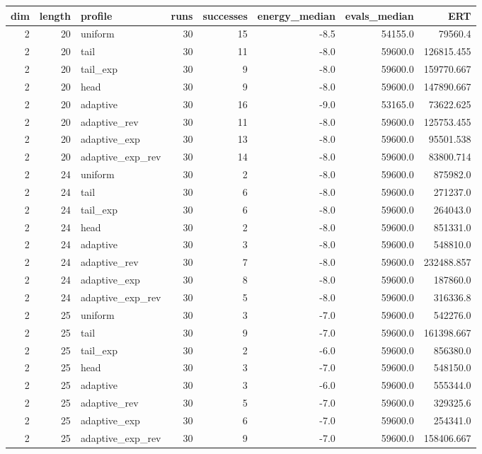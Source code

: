 \begin{tabular}{rrlrrrrr}
\hline
dim & length & profile & runs & successes & energy\_median & evals\_median & ERT \\
\hline
2 & 20 & uniform & 30 & 15 & -8.5 & 54155.0 & 79560.4 \\
2 & 20 & tail & 30 & 11 & -8.0 & 59600.0 & 126815.455 \\
2 & 20 & tail\_exp & 30 & 9 & -8.0 & 59600.0 & 159770.667 \\
2 & 20 & head & 30 & 9 & -8.0 & 59600.0 & 147890.667 \\
2 & 20 & adaptive & 30 & 16 & -9.0 & 53165.0 & 73622.625 \\
2 & 20 & adaptive\_rev & 30 & 11 & -8.0 & 59600.0 & 125753.455 \\
2 & 20 & adaptive\_exp & 30 & 13 & -8.0 & 59600.0 & 95501.538 \\
2 & 20 & adaptive\_exp\_rev & 30 & 14 & -8.0 & 59600.0 & 83800.714 \\
2 & 24 & uniform & 30 & 2 & -8.0 & 59600.0 & 875982.0 \\
2 & 24 & tail & 30 & 6 & -8.0 & 59600.0 & 271237.0 \\
2 & 24 & tail\_exp & 30 & 6 & -8.0 & 59600.0 & 264043.0 \\
2 & 24 & head & 30 & 2 & -8.0 & 59600.0 & 851331.0 \\
2 & 24 & adaptive & 30 & 3 & -8.0 & 59600.0 & 548810.0 \\
2 & 24 & adaptive\_rev & 30 & 7 & -8.0 & 59600.0 & 232488.857 \\
2 & 24 & adaptive\_exp & 30 & 8 & -8.0 & 59600.0 & 187860.0 \\
2 & 24 & adaptive\_exp\_rev & 30 & 5 & -8.0 & 59600.0 & 316336.8 \\
2 & 25 & uniform & 30 & 3 & -7.0 & 59600.0 & 542276.0 \\
2 & 25 & tail & 30 & 9 & -7.0 & 59600.0 & 161398.667 \\
2 & 25 & tail\_exp & 30 & 2 & -6.0 & 59600.0 & 856380.0 \\
2 & 25 & head & 30 & 3 & -7.0 & 59600.0 & 548150.0 \\
2 & 25 & adaptive & 30 & 3 & -6.0 & 59600.0 & 555344.0 \\
2 & 25 & adaptive\_rev & 30 & 5 & -7.0 & 59600.0 & 329325.6 \\
2 & 25 & adaptive\_exp & 30 & 6 & -7.0 & 59600.0 & 254341.0 \\
2 & 25 & adaptive\_exp\_rev & 30 & 9 & -7.0 & 59600.0 & 158406.667 \\

\end{tabular}

